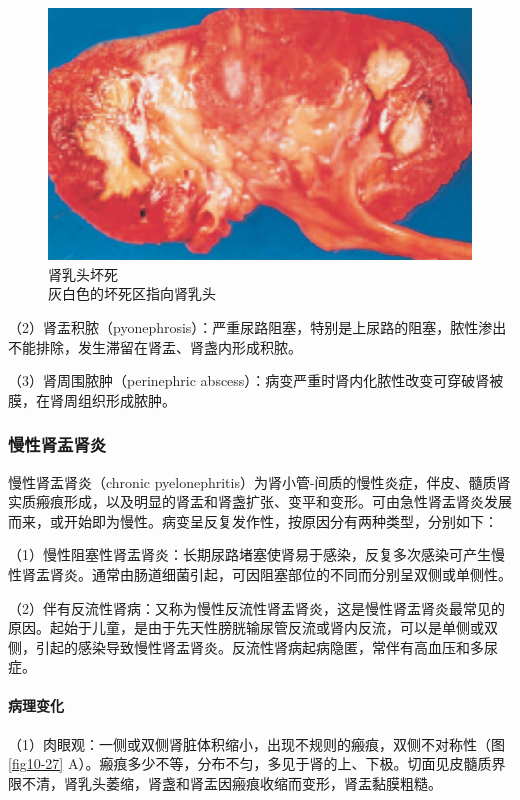 \begin{figure}[!htbp]
 \centering
 \includegraphics{./images/Image00175.jpg}
 \captionsetup{justification=centering}
 \caption{肾乳头坏死\\ {\small 灰白色的坏死区指向肾乳头}}
\label{fig10-26}
  \end{figure}

（2）肾盂积脓（pyonephrosis）：严重尿路阻塞，特别是上尿路的阻塞，脓性渗出不能排除，发生滞留在肾盂、肾盏内形成积脓。

（3）肾周围脓肿（perinephric
abscess）：病变严重时肾内化脓性改变可穿破肾被膜，在肾周组织形成脓肿。

\subsubsection{慢性肾盂肾炎}

慢性肾盂肾炎（chronic
pyelonephritis）为肾小管-间质的慢性炎症，伴皮、髓质肾实质瘢痕形成，以及明显的肾盂和肾盏扩张、变平和变形。可由急性肾盂肾炎发展而来，或开始即为慢性。病变呈反复发作性，按原因分有两种类型，分别如下：

（1）慢性阻塞性肾盂肾炎：长期尿路堵塞使肾易于感染，反复多次感染可产生慢性肾盂肾炎。通常由肠道细菌引起，可因阻塞部位的不同而分别呈双侧或单侧性。

（2）伴有反流性肾病：又称为慢性反流性肾盂肾炎，这是慢性肾盂肾炎最常见的原因。起始于儿童，是由于先天性膀胱输尿管反流或肾内反流，可以是单侧或双侧，引起的感染导致慢性肾盂肾炎。反流性肾病起病隐匿，常伴有高血压和多尿症。

\paragraph{病理变化}
（1）肉眼观：一侧或双侧肾脏体积缩小，出现不规则的瘢痕，双侧不对称性（图\ref{fig10-27}
A）。瘢痕多少不等，分布不匀，多见于肾的上、下极。切面见皮髓质界限不清，肾乳头萎缩，肾盏和肾盂因瘢痕收缩而变形，肾盂黏膜粗糙。

